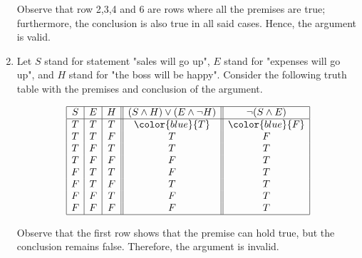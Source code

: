 \begin{enumerate}[label=(\alph*)]
Observe that row 2,3,4 and 6 are rows where all the premises are true; furthermore, the conclusion is also true in all said cases. Hence, the argument is valid.

\item Let $S$ stand for statement "sales will go up", $E$ stand for "expenses will go up", and $H$ stand for "the boss will be happy". Consider the following truth table with the premises and conclusion of the argument.

\[
\begin{array}{|c|c|c||c||c|}
\hline
S & E & H & (S \wedge H) \vee (E \wedge \neg H) & \neg (S \wedge E) \\
\hline
T & T & T & \color{blue}{T} & \color{blue}{F} \\
T & T & F & T & F \\
T & F & T & T & T \\
T & F & F & F & T \\
F & T & T & F & T \\
F & T & F & T & T \\
F & F & T & F & T \\
F & F & F & F & T \\
\hline
\end{array}
\]

Observe that the first row shows that the premise can hold true, but the conclusion remains false. Therefore, the argument is invalid.
\end{enumerate}

\pagebreak